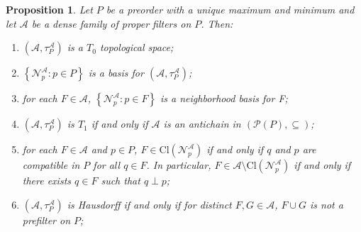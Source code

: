 \documentclass{article}
\newcommand{\aaa}{\mathcal{A} }
\newcommand{\open}[1]{\mathcal{N}^{\mathcal{A}}_{#1}}
\newcommand{\atpa}{(\aaa, \tau^\aaa_P)}
\theoremstyle{plain}
\newtheorem{proposition}[theorem]{Proposition}
\theoremstyle{definition}
\theoremstyle{remark}
\DeclareMathOperator{\RO}{RO}
\newcommand{\pow}[1]{\mathcal{P}\left(#1\right)}
\newcommand{\Cl}[1]{\text{Cl}\left(#1\right)}
\newcommand{\Reg}[1]{\text{Reg}\left(#1\right)}
\newcommand{\bp}[1]{\left\lbrace #1 \right\rbrace}
\newcommand{\0}{\mathbbm 0}
\newcommand{\1}{\mathbbm 1}
\newcommand{\2}{\mathbbm 2}
\begin{document}
\begin{proposition}
\label{prop:separationproperties}
Let $P$ be a preorder with a unique maximum and minimum and let $\aaa$ be a dense family of proper filters on $P$. 
Then: 
\begin{enumerate}
        \item \label{prop:separationproperties-1}
$\atpa$ is a $T_0$ topological space;


        \item \label{prop:separationproperties-2}
$\bp{\open{p}: p \in P}$ is a basis for $(\aaa, \tau^\aaa_P)$;   


        \item \label{prop:separationproperties-3}
for each $F \in \aaa$, $\bp{\open{p}: p \in F}$ is a neighborhood basis for F;  


        \item \label{prop:separationproperties-4}
$\atpa$ is $T_1$ if and only if $\aaa$ is an antichain in   $(\pow{P}, \subseteq)$; 


        \item \label{prop:separationproperties-5}
for each $F \in \aaa$ and $p \in P$, $F \in \Cl{\open{p}}$ if and only if $q$ and $p$ are compatible in $P$ for all $q \in F$. In particular, $F \in \aaa \setminus \Cl{\open{p}}$ if and only if there exists $q \in F$ such that $q \perp p$; 


        \item \label{prop:separationproperties-6}
$\atpa$ is Hausdorff if and only if for 
distinct $F, G \in \aaa$, $F \cup G$ is not a prefilter on $P$; 
%
%


    \end{enumerate}
\end{proposition}
\end{document}
